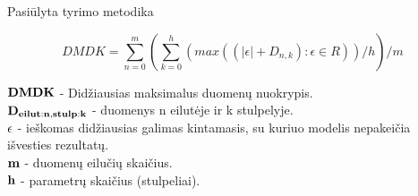 \begin{frame}[c]{Pasiūlyta tyrimo metodika}

\begin{equation}
    DMDK = {\sum_{n=0}^{m} ({\sum_{k=0}^{h} (max((|\epsilon| + D_{n, k}) : \epsilon \in R))}/{h})}/{m}
\end{equation}

$\bf DMDK$ - Didžiausias maksimalus duomenų nuokrypis. \\
$\bf D_{eilut:n,stulp:k}$ - duomenys n eilutėje ir k stulpelyje. \\
$\bf \epsilon$ - ieškomas didžiausias galimas kintamasis, su kuriuo modelis nepakeičia išvesties rezultatų. \\
$\bf m$ - duomenų eilučių skaičius. \\
$\bf h$ - parametrų skaičius (stulpeliai).

\end{frame}